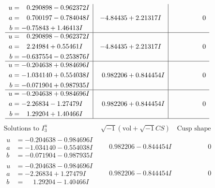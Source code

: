 \documentclass[1p]{elsarticle_modified}
\theoremstyle{definition}
\newcommand{\I}{\sqrt{-1}}
\begin{document}
$$\begin{array}{c|c|c}
\begin{aligned}
u &= \phantom{-}0.290898 - 0.962372 I \\
a &= \phantom{-}0.700197 - 0.784048 I \\
b &= -0.75843 + 1.46413 I\end{aligned}
 & -4.84435 + 2.21317 I & \phantom{-0.000000 } 0 \\ \hline\begin{aligned}
u &= \phantom{-}0.290898 - 0.962372 I \\
a &= \phantom{-}2.24984 + 0.55461 I \\
b &= -0.637554 - 0.253876 I\end{aligned}
 & -4.84435 + 2.21317 I & \phantom{-0.000000 } 0 \\ \hline\begin{aligned}
u &= -0.204638 + 0.984696 I \\
a &= -1.034140 + 0.554038 I \\
b &= -0.071904 + 0.987935 I\end{aligned}
 & \phantom{-}0.982206 + 0.844454 I & \phantom{-0.000000 } 0 \\ \hline\begin{aligned}
u &= -0.204638 + 0.984696 I \\
a &= -2.26834 - 1.27479 I \\
b &= \phantom{-}1.29204 + 1.40466 I\end{aligned}
 & \phantom{-}0.982206 + 0.844454 I & \phantom{-0.000000 } 0\\
 \hline 
 \end{array}$$\newpage$$\begin{array}{c|c|c}  
\text{Solutions to }I^u_{3}& \I (\text{vol} + \sqrt{-1}CS) & \text{Cusp shape}\\
 \hline 
\begin{aligned}
u &= -0.204638 - 0.984696 I \\
a &= -1.034140 - 0.554038 I \\
b &= -0.071904 - 0.987935 I\end{aligned}
 & \phantom{-}0.982206 - 0.844454 I & \phantom{-0.000000 } 0 \\ \hline\begin{aligned}
u &= -0.204638 - 0.984696 I \\
a &= -2.26834 + 1.27479 I \\
b &= \phantom{-}1.29204 - 1.40466 I\end{aligned}
 & \phantom{-}0.982206 - 0.844454 I & \phantom{-0.000000 } 0 \\ \hline\begin{aligned}

\end{aligned}
\end{array}$$
\end{document}

